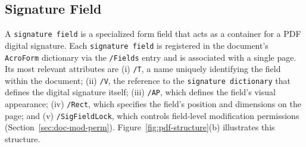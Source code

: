 \documentclass[12pt]{article}
\begin{document}
%
%


\subsection{Signature Field} \label{sec:sig-field}

A \texttt{signature field} is a specialized form field that acts as a container for a PDF digital signature. Each \texttt{signature field} is registered in the document's \texttt{AcroForm} dictionary via the \texttt{/Fields} entry and is associated with a single page. Its most relevant attributes are (i) \texttt{/T}, a name uniquely identifying the field within the document; (ii) \texttt{/V}, the reference to the \texttt{signature dictionary} that defines the digital signature itself; (iii) \texttt{/AP}, which defines the field's visual appearance; (iv) \texttt{/Rect}, which specifies the field's position and dimensions on the page; and (v) \texttt{/SigFieldLock}, which controls field-level modification permissions (Section~\ref{sec:doc-mod-perm}). Figure~\ref{fig:pdf-structure}(b) illustrates this structure.
\end{document}

